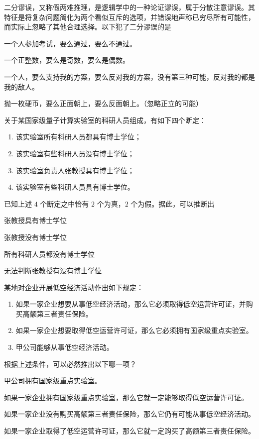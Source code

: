 \documentclass{exam-zh}
\begin{document}
\begin{question}
二分谬误，又称假两难推理，是逻辑学中的一种论证谬误，属于分散注意谬误。其特征是将复杂问题简化为两个看似互斥的选项，并错误地声称已穷尽所有可能性，而实际上忽略了其他合理选择。以下犯了二分谬误的是 \paren[]
\begin{choices}
  \item 一个人参加考试，要么通过，要么不通过。
  \item 一个正整数，要么是奇数，要么是偶数。
  \item 一个人，要么支持我的方案，要么反对我的方案，没有第三种可能，反对我的都是我的敌人。
  \item 抛一枚硬币，要么正面朝上，要么反面朝上。（忽略正立的可能）
\end{choices}
\end{question}

\begin{question}
关于某国家级量子计算实验室的科研人员组成，有如下四个断定：
\begin{enumerate}
  \item 该实验室所有科研人员都具有博士学位；
  \item 该实验室有些科研人员没有博士学位；
  \item 该实验室负责人张教授具有博士学位；
  \item 该实验室有些科研人员具有博士学位。
\end{enumerate}
已知上述 $4$ 个断定之中恰有 $2$ 个为真，$2$ 个为假。据此，可以推断出 \paren[]
\begin{choices}
  \item 张教授具有博士学位
  \item 张教授没有博士学位
  \item 所有科研人员都没有博士学位
  \item 无法判断张教授有没有博士学位
\end{choices}
\end{question}

\begin{question}
某地对企业开展低空经济活动作出如下规定：
\begin{enumerate}
  \item 如果一家企业想要从事低空经济活动，那么它必须取得低空运营许可证，并购买高额第三者责任保险。
  \item 如果一家企业想要取得低空运营许可证，那么它必须拥有国家级重点实验室。
  \item 甲公司能够从事低空经济活动。
\end{enumerate}
根据上述条件，可以必然推出以下哪一项？\paren[]
\begin{choices}
  \item 甲公司拥有国家级重点实验室。
  \item 如果一家企业拥有国家级重点实验室，那么它就一定能够取得低空运营许可证。
  \item 如果一家企业没有购买高额第三者责任保险，那么它仍有可能从事低空经济活动。
  \item 如果一家企业取得了低空运营许可证，那么它就一定购买了高额第三者责任保险。
\end{choices}
\end{question}
\end{document}
